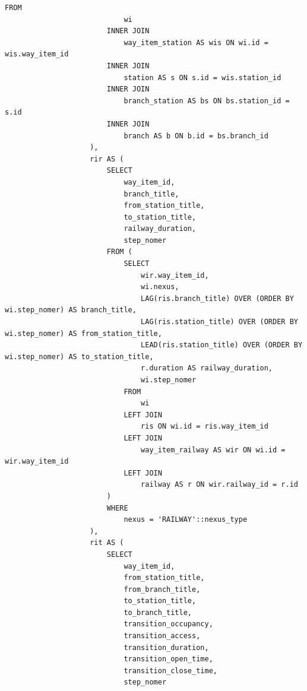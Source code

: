 \begin{lstlisting}[label=lst:get_route_json_by_id:2,caption=Реализация функции получения маршрута (часть 2),firstnumber=37]
                        FROM
                            wi
                        INNER JOIN
                            way_item_station AS wis ON wi.id = wis.way_item_id
                        INNER JOIN
                            station AS s ON s.id = wis.station_id
                        INNER JOIN
                            branch_station AS bs ON bs.station_id = s.id
                        INNER JOIN
                            branch AS b ON b.id = bs.branch_id
                    ),
                    rir AS (
                        SELECT
                            way_item_id,
                            branch_title,
                            from_station_title,
                            to_station_title,
                            railway_duration,
                            step_nomer
                        FROM (
                            SELECT
                                wir.way_item_id,
                                wi.nexus,
                                LAG(ris.branch_title) OVER (ORDER BY wi.step_nomer) AS branch_title,
                                LAG(ris.station_title) OVER (ORDER BY wi.step_nomer) AS from_station_title,
                                LEAD(ris.station_title) OVER (ORDER BY wi.step_nomer) AS to_station_title,
                                r.duration AS railway_duration,
                                wi.step_nomer
                            FROM
                                wi
                            LEFT JOIN
                                ris ON wi.id = ris.way_item_id
                            LEFT JOIN
                                way_item_railway AS wir ON wi.id = wir.way_item_id
                            LEFT JOIN
                                railway AS r ON wir.railway_id = r.id
                        )
                        WHERE
                            nexus = 'RAILWAY'::nexus_type
                    ),
                    rit AS (
                        SELECT
                            way_item_id,
                            from_station_title,
                            from_branch_title,
                            to_station_title,
                            to_branch_title,
                            transition_occupancy,
                            transition_access,
                            transition_duration,
                            transition_open_time,
                            transition_close_time,
                            step_nomer
\end{lstlisting}


